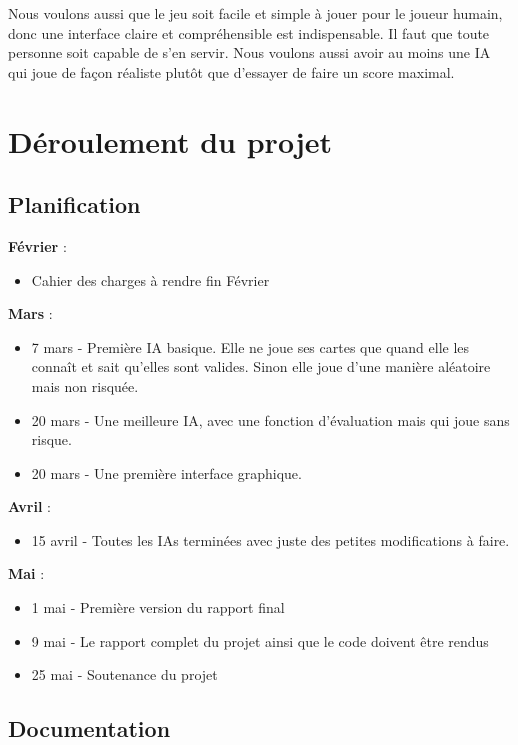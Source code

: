\documentclass{article}
\begin{document}
Nous voulons aussi que le jeu soit facile et simple à jouer pour le joueur humain, donc une interface claire et compréhensible est indispensable. Il faut que toute personne soit capable de s’en servir. Nous voulons aussi avoir au moins une IA qui joue de façon réaliste plutôt que d'essayer de faire un score maximal.

\section{Déroulement du projet}

\subsection{Planification}

{\bfseries Février} :
\begin{itemize}
    \item Cahier des charges à rendre fin Février
\end{itemize}

{\bfseries Mars} :
\begin{itemize}
    \item 7 mars - Première IA basique. Elle ne joue ses cartes que quand elle les connaît et sait qu'elles sont valides. Sinon elle joue d'une manière aléatoire mais non risquée.
    \item 20 mars - Une meilleure IA, avec une fonction d'évaluation mais qui joue sans risque.
    \item 20 mars - Une première interface graphique.
\end{itemize}

{\bfseries Avril} :
\begin{itemize}
    \item 15 avril - Toutes les IAs terminées avec juste des petites modifications à faire.\\
\end{itemize}

{\bfseries Mai} :
\begin{itemize}
    \item 1 mai - Première version du rapport final
    \item 9 mai - Le rapport complet du projet ainsi que le code doivent être rendus
    \item 25 mai - Soutenance du projet
\end{itemize}
    

\subsection{Documentation}
\end{document}
